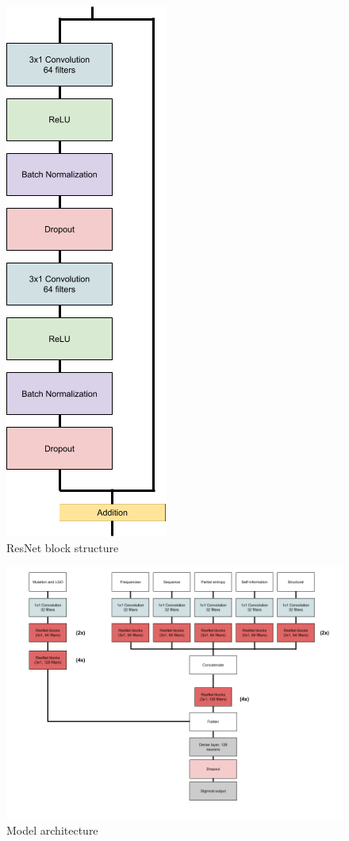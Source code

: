 \documentclass[11pt]{article}
\begin{document}
\begin{figure}[h!]
  \centering
  \includegraphics[scale=0.3]
    {Block_cropped.png}
  \centering
  \caption{ ResNet block structure }
  \label{fig:block}
\end{figure}

\begin{figure}[h!]
\hspace*{-0.8in}
  \centering
  \includegraphics[scale=0.5]
    {model.png}
  \centering
  \caption{ Model architecture }
  \label{fig:model}
\end{figure}
\end{document}
